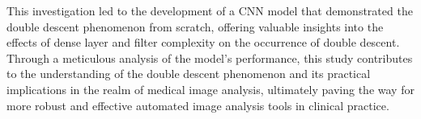 This investigation led to the development of a CNN model that demonstrated the double descent phenomenon from scratch, offering valuable insights into the effects of dense layer and filter complexity on the occurrence of double descent. Through a meticulous analysis of the model's performance, this study contributes to the understanding of the double descent phenomenon and its practical implications in the realm of medical image analysis, ultimately paving the way for more robust and effective automated image analysis tools in clinical practice.
